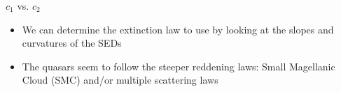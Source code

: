 \documentclass[landscape,9pt]{beamer}
\begin{document}

\begin{frame}
	\begin{block}{$c_1$ vs. $c_2$}
	\begin{itemize}
		\item<1-> We can determine the extinction law to use by looking at the slopes and curvatures of the SEDs
		\item<2> The quasars seem to follow the steeper reddening laws: Small Magellanic Cloud (SMC) and/or multiple scattering \citep{Goobar:2008} laws
	\end{itemize}
	\end{block}
\end{frame}
\end{document}
